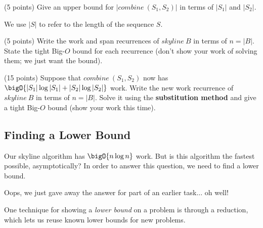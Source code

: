\begin{flex}
\begin{task}[7]
(5 points)
Give an upper bound for $\left|\mathit{combine}~(S_1, S_2)\right|$ in terms
of $|S_1|$ and $|S_2|$.
\end{task}

\begin{note}
We use $|S|$ to refer to the length of the sequence $S$.
\end{note}
\end{flex}

\begin{task}[8]
(5 points)
Write the work and span recurrences of $\mathit{skyline}~B$ in
terms of $n = |B|$. State the tight Big-$O$ bound for each recurrence (don't
show your work of solving them; we just want the bound).
\end{task}

\begin{task}[9]
(15 points)
Suppose that $\mathit{combine}~(S_1, S_2)$ now has
$\bigO{|S_1|\log|S_1| + |S_2|\log|S_2|}$ work. Write the new work recurrence of
$\mathit{skyline}~B$ in terms of $n = |B|$. Solve it using the
\textbf{substitution method} and give a tight Big-$O$ bound (show your work this time).
\end{task}

\subsection{Finding a Lower Bound}

\begin{flex}

Our skyline algorithm has $\bigO {n \log n}$ work. But is this
algorithm the fastest possible, asymptotically? In order to answer this
question, we need to find a lower bound.


\begin{remark}
Oops, we just gave away the answer for part of an earlier task... oh well!
\end{remark}
\end{flex}


One technique for showing a \emph{lower bound} on a problem is through a
reduction, which lets us reuse known lower bounds for new problems.

